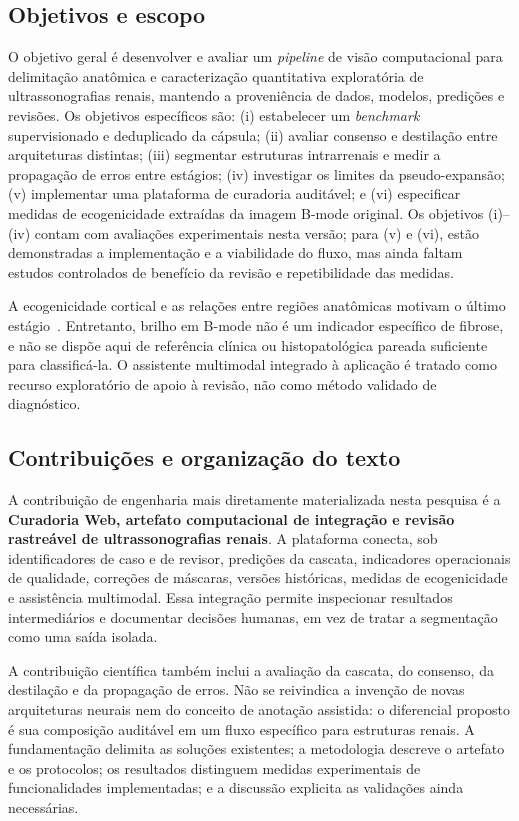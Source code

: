 \documentclass[12pt]{article}
\begin{document}
\subsection{Objetivos e escopo}
O objetivo geral é desenvolver e avaliar um \textit{pipeline} de visão computacional para delimitação anatômica e caracterização quantitativa exploratória de ultrassonografias renais, mantendo a proveniência de dados, modelos, predições e revisões. Os objetivos específicos são: (i) estabelecer um \textit{benchmark} supervisionado e deduplicado da cápsula; (ii) avaliar consenso e destilação entre arquiteturas distintas; (iii) segmentar estruturas intrarrenais e medir a propagação de erros entre estágios; (iv) investigar os limites da pseudo-expansão; (v) implementar uma plataforma de curadoria auditável; e (vi) especificar medidas de ecogenicidade extraídas da imagem B-mode original. Os objetivos (i)--(iv) contam com avaliações experimentais nesta versão; para (v) e (vi), estão demonstradas a implementação e a viabilidade do fluxo, mas ainda faltam estudos controlados de benefício da revisão e repetibilidade das medidas.

A ecogenicidade cortical e as relações entre regiões anatômicas motivam o último estágio~\cite{Manley2001,Moghazi2005,Beutler2024SRI,Zhao2025Echogenicity}. Entretanto, brilho em B-mode não é um indicador específico de fibrose, e não se dispõe aqui de referência clínica ou histopatológica pareada suficiente para classificá-la. O assistente multimodal integrado à aplicação é tratado como recurso exploratório de apoio à revisão, não como método validado de diagnóstico.

\subsection{Contribuições e organização do texto}
A contribuição de engenharia mais diretamente materializada nesta pesquisa é a \textbf{Curadoria Web, artefato computacional de integração e revisão rastreável de ultrassonografias renais}. A plataforma conecta, sob identificadores de caso e de revisor, predições da cascata, indicadores operacionais de qualidade, correções de máscaras, versões históricas, medidas de ecogenicidade e assistência multimodal. Essa integração permite inspecionar resultados intermediários e documentar decisões humanas, em vez de tratar a segmentação como uma saída isolada.

A contribuição científica também inclui a avaliação da cascata, do consenso, da destilação e da propagação de erros. Não se reivindica a invenção de novas arquiteturas neurais nem do conceito de anotação assistida: o diferencial proposto é sua composição auditável em um fluxo específico para estruturas renais. A fundamentação delimita as soluções existentes; a metodologia descreve o artefato e os protocolos; os resultados distinguem medidas experimentais de funcionalidades implementadas; e a discussão explicita as validações ainda necessárias.
\end{document}
